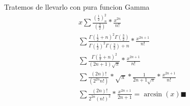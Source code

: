 \begin{mdframed}
\begin{itemize}
{        Tratemos de llevarlo con pura funcion Gamma
            \begin{gather*}
                x\sum \frac{(\frac{1}{2})_n^2}{(\frac{3}{2})}*\frac{x^{2n}}{n!}\\
                \sum \frac{\Gamma(\frac{1}{2}+n)^2\Gamma(\frac{3}{2})}{\Gamma(\frac{1}{2})^2\Gamma(\frac{3}{2})+n}*\frac{x^{2n+1}}{n!}\\
                \sum \frac{\Gamma(\frac{1}{2}+n)^2}{(2n+1)\sqrt{\pi}}*\frac{x^{2n+1}}{n!}\\
                \sum \frac{(2n)!}{(2^{2n}n!)}*\sqrt{\pi}*\frac{1}{{2n+1}\sqrt{\pi}}*\frac{x^{2n+1}}{n!}\\
                \sum \frac{(2n)!}{2^{2n}(n!)^2}*\frac{x^{2n+1}}{2n+1} = \arcsin(x) \blacksquare
            \end{gather*}
        }
    \end{itemize}
\end{mdframed}

